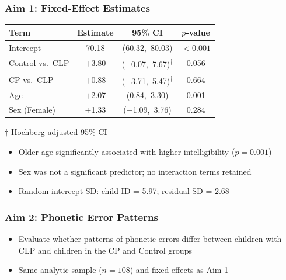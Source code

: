 \documentclass{beamer}
\begin{document}
\begin{frame}
\frametitle{Aim 1: Fixed-Effect Estimates}
\vspace{0.2em}
\scriptsize
\renewcommand{\arraystretch}{1.25}
\begin{center}
\begin{tabular}{@{}lccc@{}}
\toprule
\textbf{Term} & \textbf{Estimate} & \textbf{95\% CI} & \textbf{\(p\)-value} \\
\midrule
Intercept        & 70.18 & (60.32,\ 80.03) & $<0.001$ \\
Control vs.\ CLP & $+$3.80 & ($-$0.07,\ 7.67)\textsuperscript{$\dagger$} & 0.056   \\
CP vs.\ CLP      & $+$0.88 & ($-$3.71,\ 5.47)\textsuperscript{$\dagger$} & 0.664   \\
Age              & $+$2.07 & (0.84,\ 3.30)  & 0.001    \\
Sex (Female)     & $+$1.33 & ($-$1.09,\ 3.76) & 0.284  \\
\bottomrule
\end{tabular}
\end{center}
{\tiny $\dagger$ Hochberg-adjusted 95\% CI}
\normalsize
\vspace{0.2em}
\begin{itemize}
  \item Older age significantly associated with higher intelligibility ($p = 0.001$)
  \item Sex was not a significant predictor; no interaction terms retained
  \item Random intercept SD: child ID = 5.97; residual SD = 2.68
\end{itemize}
\end{frame}
\begin{frame}
\frametitle{Aim 2: Phonetic Error Patterns}
\begin{itemize}
  \item Evaluate whether patterns of phonetic errors differ between children with CLP and children in the CP and Control groups
  \item Same analytic sample ($n = 108$) and fixed effects as Aim 1
\end{itemize}
\end{frame}
\end{document}
